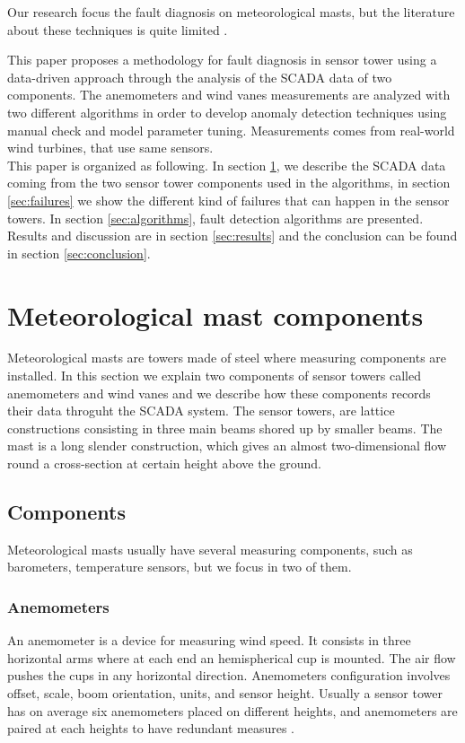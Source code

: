 \documentclass[conference]{IEEEtran}
\begin{document}
Our research focus the fault diagnosis on meteorological masts,   
but the literature about these techniques is quite limited \cite{hasu2006weather} .

This paper proposes a methodology for fault diagnosis in sensor tower using a data-driven approach through the analysis of the SCADA data of two components. The anemometers and wind vanes measurements are analyzed with two different algorithms in order to develop anomaly detection techniques using manual check and model parameter tuning. Measurements comes from real-world wind turbines, that use same sensors.  \\
This paper is organized as following. In section \ref{sec:sensortower}, we describe the SCADA data coming from the two sensor tower components used in the algorithms, in section \ref{sec:failures} we show the different kind of failures that can happen in the sensor towers. In section \ref{sec:algorithms}, fault detection algorithms are presented. Results and discussion are in section \ref{sec:results} and the conclusion can be found in section \ref{sec:conclusion}.

\section{Meteorological mast components}\label{sec:sensortower}
Meteorological masts are towers made of steel where measuring components are installed. In this section we explain two components of sensor towers called anemometers and wind vanes and we describe how these components records their data throguht the SCADA system.
The sensor towers, are  lattice constructions consisting in three main beams shored up by smaller beams. The mast is a long slender construction, which gives an almost two-dimensional flow round a cross-section at certain height above the ground. 

\subsection{Components}
Meteorological masts usually have several measuring components, such as barometers, temperature sensors, but we focus in two of them.
\subsubsection{Anemometers}
An anemometer is a device for measuring wind speed. It consists in three horizontal arms where at each end an hemispherical cup is mounted. The air flow pushes the cups in any horizontal direction. Anemometers configuration involves offset, scale, boom orientation, units, and sensor height. Usually a sensor tower has on average six anemometers placed on different heights, and  anemometers are paired at each heights to have redundant measures \cite{clifton2014135}.
\end{document}
